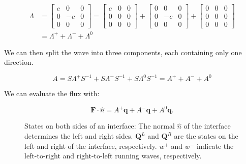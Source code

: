 \begin{equation}
    \begin{split}
        \Lambda & = 
        \begin{bmatrix}
            c & 0 & 0 \\ 
            0 & -c & 0 \\ 
            0 & 0 & 0
        \end{bmatrix} = 
        \begin{bmatrix}
            c & 0 & 0 \\ 
            0 & 0 & 0 \\ 
            0 & 0 & 0
        \end{bmatrix} +
        \begin{bmatrix}
            0 & 0 & 0 \\ 
            0 & -c & 0 \\ 
            0 & 0 & 0
        \end{bmatrix} +
        \begin{bmatrix}
            0 & 0 & 0 \\ 
            0 & 0 & 0 \\ 
            0 & 0 & 0
        \end{bmatrix} \\
        &= \Lambda^+ + \Lambda^- + \Lambda^0
    \end{split}
\end{equation}

We can then split the wave into three components, each containing only one direction.

\begin{equation}
    A = S \Lambda^+ S^{-1} + S \Lambda^- S^{-1} + S \Lambda^0 S^{-1} = A^+ + A^- + A^0
\end{equation}

We can evaluate the flux with:

\begin{equation} \label{equ:flux}
    \mathbf{F} \cdot \widehat{n} = A^+\mathbf{q} + A^-\mathbf{q} + A^0 \mathbf{q}.
\end{equation}

\begin{figure}[H]
    \centering
    
    \caption{States on both sides of an interface: The normal \(\widehat{n}\) of the interface
        determines the left and right sides. \(\mathbf{Q}^L\) and \(\mathbf{Q}^R\) are the states on
        the left and right of the interface, respectively. \(w^+\) and \(w^-\) indicate the
        left-to-right and right-to-left running waves, respectively.}\label{fig:waves}
\end{figure}

